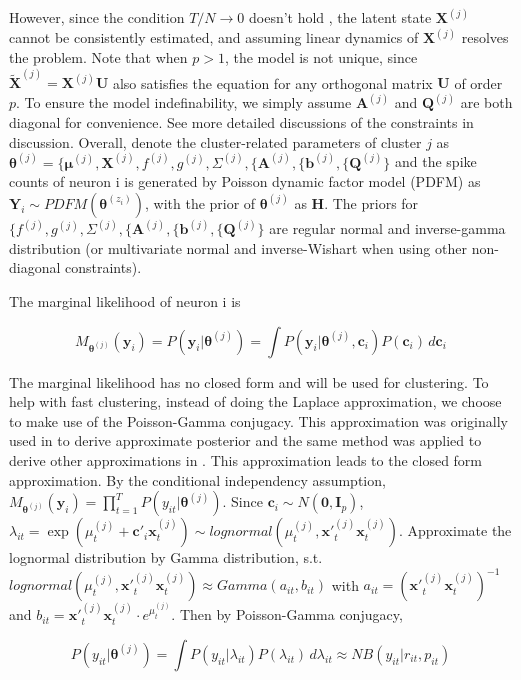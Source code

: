 \documentclass{article}
\begin{document}
	However, since the condition $T/N \rightarrow 0$ doesn’t hold \citep{bibid}, the latent state $\bm{X}^{(j)}$ cannot be consistently estimated, and assuming linear dynamics of $\bm{X}^{(j)}$ resolves the problem. Note that when $p>1$, the model is not unique, since $\widetilde{\bm{X}}^{(j)} = \bm{X}^{(j)}\bm{U}$ also satisfies the equation for any orthogonal matrix $\bm{U}$ of order $p$. To ensure the model indefinability, we simply assume $\bm{A}^{(j)}$ and $\bm{Q}^{(j)}$
	are both diagonal for convenience. See more detailed discussions of the constraints in discussion. Overall, denote the cluster-related parameters of cluster $j$ as $\bm{\theta}^{(j)}= \{\bm{\mu}^{(j)}, \bm{X}^{(j)}, f^{(j)}, g^{(j)}, \Sigma^{(j)},\{\bm{A}^{(j)}, \{\bm{b}^{(j)}, \{\bm{Q}^{(j)}\}$ and the spike counts of neuron i is generated by Poisson dynamic factor model (PDFM) as $\bm{Y}_i\sim PDFM(\bm{\theta}^{(z_i)})$, with the prior of $\bm{\theta}^{(j)}$ as $\bm{H}$. The priors for $\{f^{(j)}, g^{(j)}, \Sigma^{(j)},\{\bm{A}^{(j)}, \{\bm{b}^{(j)}, \{\bm{Q}^{(j)}\}$ are regular  normal and inverse-gamma distribution (or multivariate normal and inverse-Wishart when using other non-diagonal constraints).

	The marginal likelihood of neuron i is
	
	$$M_{\bm{\theta}^{(j)}}(\bm{y}_i) = P(\bm{y}_i|\bm{\theta}^{(j)}) = \int P(\bm{y}_i|\bm{\theta}^{(j)}, \bm{c}_i)P(\bm{c}_i)\,d\bm{c}_i$$
	
	The marginal likelihood has no closed form and will be used for clustering. To help with fast clustering, instead of doing the Laplace approximation, we choose to make use of the Poisson-Gamma conjugacy. This approximation was originally used in \citet{El-Sayyad1973} to derive approximate posterior and the same method was applied to derive other approximations in \citet{Chan2009}. This approximation leads to the closed form approximation. By the conditional independency assumption, $M_{\bm{\theta}^{(j)}}(\bm{y}_i)=\prod_{t=1}^{T}P(y_{it}|\bm{\theta}^{(j)})$. Since $\bm{c}_i\sim N(\bm{0},\bm{I}_p)$, $\lambda_{it} = \exp(\mu_t^{(j)} + \bm{c}'_i\bm{x}^{(j)}_t)\sim lognormal(\mu_t^{(j)}, \bm{x}'^{(j)}_t\bm{x}^{(j)}_t)$. Approximate the lognormal distribution by Gamma distribution, s.t. $lognormal(\mu_t^{(j)}, \bm{x}'^{(j)}_t\bm{x}^{(j)}_t) \approx Gamma(a_{it}, b_{it})$ with $a_{it} = (\bm{x}'^{(j)}_t\bm{x}^{(j)}_t)^{-1}$ and $b_{it} = \bm{x}'^{(j)}_t\bm{x}^{(j)}_t\cdot e^{\mu_t^{(j)}}$. Then by Poisson-Gamma conjugacy,
	
	$$
	P(y_{it}|\bm{\theta}^{(j)}) = \int P(y_{it}|\lambda_{it})P(\lambda_{it})\,d\lambda_{it}\approx NB(y_{it}|r_{it}, p_{it})
	$$
	
\end{document}
